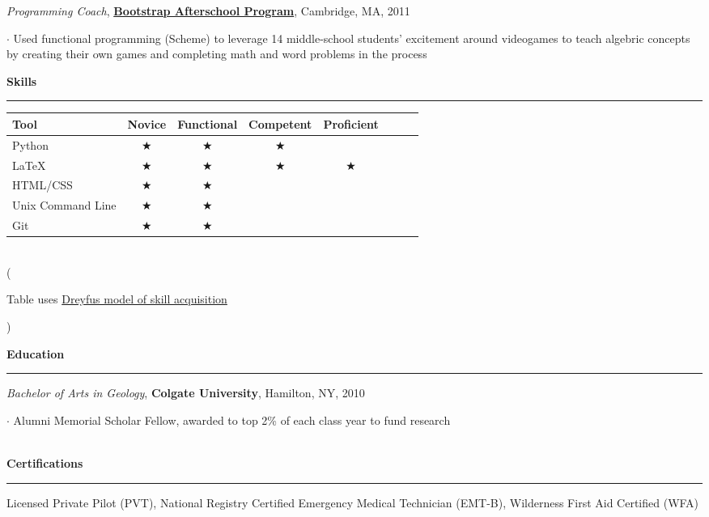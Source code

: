 \documentclass[11pt]{article}
\begin{document}
\smallskip
\emph{Programming Coach}, \textbf{\href{http://www.bootstrapworld.org}{Bootstrap Afterschool Program}}, Cambridge, MA, 2011\\
\begin{small}$\cdot$ {Used functional programming (Scheme) to leverage 14 middle-school students' excitement around videogames to teach algebric concepts by creating their own games and completing math and word problems in the process}\end{small}

\smallskip
\vspace*{0.25 mm}
\textbf{Skills}
\smallskip
\hrule

\begin{table}[h]
\begin{center}
\begin{tabular}{l*{6}{c}r}
\hline
Tool      & Novice & Functional & Competent & Proficient \\
\hline
Python & $\bigstar$ & $\bigstar$ & $\bigstar$ &  &   \\
\LaTeX            & $\bigstar$ & $\bigstar$ & $\bigstar$ & $\bigstar$ &   \\
HTML/CSS     & $\bigstar$ & $\bigstar$ &  &  &   \\
Unix Command Line     & $\bigstar$ & $\bigstar$ &  &  &    \\
Git     & $\bigstar$ & $\bigstar$ &  &  &    \\
\hline
\end{tabular} \\
(\begin{small}Table uses \href{https://en.wikipedia.org/wiki/Dreyfus\_model\_of\_skill\_acquisition\#The\_original\_five-stage\_model}{Dreyfus model of skill acquisition}\end{small})
\end{center}
\end{table}  

\vspace*{0.25 mm}
\textbf{Education}
\smallskip
\hrule 
\emph{Bachelor of Arts in Geology}, \textbf{Colgate University}, Hamilton, NY, 2010 \\
\begin{small}$\cdot$ {Alumni Memorial Scholar Fellow, awarded to top 2\% of each class year to fund research }\end{small}\\

\vspace*{0.25 mm}
\textbf{Certifications}
\smallskip
\hrule  
Licensed Private Pilot (PVT), National Registry Certified Emergency Medical Technician (EMT-B), Wilderness First Aid Certified (WFA) \\
\end{document}
